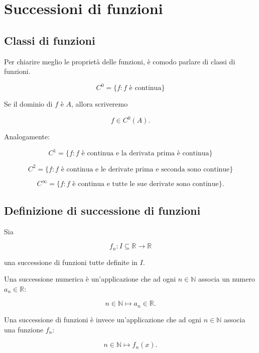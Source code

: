 
\section{Successioni di funzioni}

\subsection{Classi di funzioni}

Per chiarire meglio le proprietà delle funzioni, è comodo parlare di classi
di funzioni.

\[
C^0 = \{f : f \text{ è continua}\}
\]

Se il dominio di $f$ è $A$, allora scriveremo

\[
f \in C^0(A).
\]

Analogamente:

\[
C^1 =
\{f : f \text{ è continua e la derivata prima è continua}\}
\]

\[
C^2 =
\{f : f \text{ è continua e le derivate prima e seconda sono continue}\}
\]

\[
C^\infty =
\{f : f \text{ è continua e tutte le sue derivate sono continue}\}.
\]


\subsection{Definizione di successione di funzioni}

\begin{definition}

Sia

\[
f_n : I \subseteq \mathbb{R} \to \mathbb{R}
\]

una successione di funzioni tutte definite in $I$.

\end{definition}


\begin{oss}

Una successione numerica è un'applicazione che ad ogni
$n \in \mathbb{N}$ associa un numero $a_n \in \mathbb{R}$:

\[
n \in \mathbb{N} \longmapsto a_n \in \mathbb{R}.
\]

Una successione di funzioni è invece un'applicazione che ad ogni
$n \in \mathbb{N}$ associa una funzione $f_n$:

\[
n \in \mathbb{N} \longmapsto f_n(x).
\]

\end{oss}


